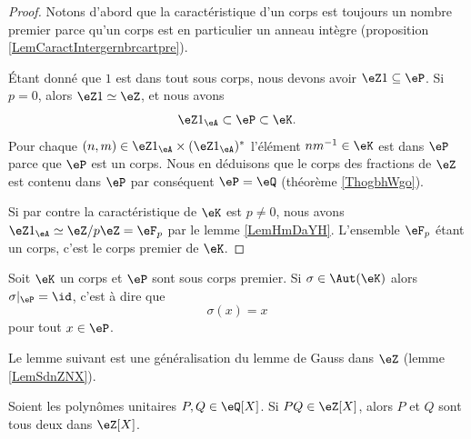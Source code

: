 \begin{proof}
    Notons d'abord que la caractéristique d'un corps est toujours un nombre premier parce qu'un corps est en particulier un anneau intègre (proposition \ref{LemCaractIntergernbrcartpre}).

    Étant donné que \( 1\) est dans tout sous corps, nous devons avoir \( \eZ 1\subseteq \eP\). Si \( p=0\), alors \( \eZ 1\simeq \eZ\), et nous avons
    \begin{equation}
        \eZ 1_{\eA}\subset \eP\subset \eK.
    \end{equation}
    Pour chaque \( (n,m)\in \eZ 1_{\eA}\times (\eZ 1_{\eA})^*\) l'élément \( nm^{-1}\in \eK\) est dans \( \eP\) parce que \( \eP\) est un corps. Nous en déduisons que le corps des fractions de \( \eZ\) est contenu dans \( \eP\) par conséquent \( \eP=\eQ\) (théorème \ref{ThogbhWgo}). 

    Si par contre la caractéristique de \( \eK\) est \( p\neq 0\), nous avons \( \eZ 1_{\eA}\simeq\eZ/p\eZ=\eF_p\) par le lemme \ref{LemHmDaYH}. L'ensemble \( \eF_p\) étant un corps, c'est le corps premier de \( \eK\).
\end{proof}

\begin{proposition}     \label{PropqPPrgJ}
    Soit \( \eK\) un corps et \( \eP\) sont sous corps premier. Si \( \sigma\in\Aut(\eK)\) alors \( \sigma|_{\eP}=\id\), c'est à dire que
    \begin{equation}
        \sigma(x)=x
    \end{equation}
    pour tout \( x\in \eP\).
\end{proposition}

Le lemme suivant est une généralisation du lemme de Gauss dans \( \eZ\) (lemme \ref{LemSdnZNX}).
\begin{lemma}       \label{LemEfdkZw}   
    Soient les polynômes unitaires \( P,Q\in \eQ[X]\). Si \( PQ\in\eZ[X]\), alors \( P\) et \( Q\) sont tous deux dans \( \eZ[X]\).
\end{lemma}

